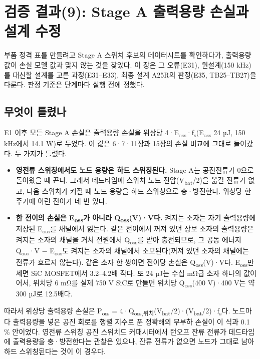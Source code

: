 \chapter{검증 결과(9): Stage A 출력용량 손실과 설계 수정}

부품 정격 표를 만들려고 Stage A 스위치 후보의 데이터시트를 확인하다가, 출력용량 값이 손실 모델 값과 맞지 않는 것을 찾았다. 이 장은 그 오류(E31), 원설계(150 kHz)를 대신할 설계를 고른 과정(E31–E33), 최종 설계 A25R의 판정(E35, TB25–TB27)을 다룬다. 판정 기준은 단계마다 실행 전에 정했다.

\section{무엇이 틀렸나}

E1 이후 모든 Stage A 손실은 출력용량 손실을 위상당 4·E\textsubscript{oss}·f\textsubscript{s}(E\textsubscript{oss} 24 µJ, 150 kHz에서 14.1 W)로 두었다. 이 값은 6·7·11장과 15장의 손실 비교에 그대로 들어갔다. 두 가지가 틀렸다.

\begin{itemize}
\item \textbf{영전류 스위칭에서도 노드 용량은 하드 스위칭된다.} Stage A는 공진전류가 0으로 돌아왔을 때 끈다. 그래서 데드타임에 스위치 노드 전압(V\textsubscript{bat}/2)을 옮길 전류가 없고, 다음 스위치가 켜질 때 노드 용량을 하드 스위칭으로 충·방전한다. 위상당 한 주기에 이런 전이가 네 번 있다.
\item \textbf{한 전이의 손실은 E\textsubscript{oss}가 아니라 Q\textsubscript{oss}(V)·V다.} 켜지는 소자는 자기 출력용량에 저장된 E\textsubscript{oss}를 채널에서 잃는다. 같은 전이에서 꺼져 있던 상보 소자의 출력용량은 켜지는 소자의 채널을 거쳐 전원에서 Q\textsubscript{oss}를 받아 충전되므로, 그 공동 에너지 Q\textsubscript{oss}·V − E\textsubscript{oss}도 켜지는 소자의 채널에서 소모된다(꺼져 있던 소자의 채널에는 전류가 흐르지 않는다)\cite{b32}. 같은 소자 한 쌍이면 전이당 손실은 Q\textsubscript{oss}(V)·V다. E\textsubscript{oss}만 세면 SiC MOSFET에서 3.2–4.2배 작다. 또 24 µJ는 수십 mΩ급 소자 하나의 값이어서, 위치당 6 mΩ를 실제 750 V SiC로 만들면 위치당 Q\textsubscript{oss}(400 V)·400 V는 약 300 µJ로 12.5배다.
\end{itemize}

따라서 위상당 출력용량 손실은 P\textsubscript{oss} = 4·Q\textsubscript{oss,위치}(V\textsubscript{bat}/2)·(V\textsubscript{bat}/2)·f\textsubscript{s}다. 노드마다 출력용량을 넣은 공진 회로를 행렬 지수로 푼 정확해의 무부하 손실이 이 식과 0.1 \% 안이었다. 영전류 스위칭 공진 스위치드 커패시터에서 턴오프 잔류 전류가 데드타임에 출력용량을 충·방전한다는 관찰은 있으나\cite{b33}, 잔류 전류가 없으면 노드가 그대로 남아 하드 스위칭된다는 것이 이 경우다.

